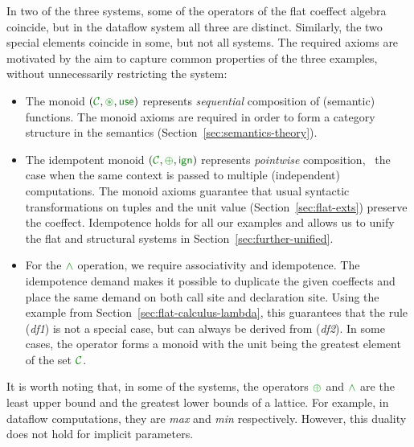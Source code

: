 \noindent
In two of the three systems, some of the operators of the flat coeffect algebra coincide, but
in the dataflow system all three are distinct. Similarly, the two special elements
coincide in some, but not all systems. The required axioms are motivated by the aim to capture
common properties of the three examples, without unnecessarily restricting the system:

\begin{itemize}
\item The monoid $(\C, \cseq, \cunit)$ represents \emph{sequential} composition of (semantic)
functions. The monoid axioms are required in order to form a category structure in the
semantics (Section~\ref{sec:semantics-theory}).

\item The idempotent monoid $(\C, \cpar, \czero)$ represents \emph{pointwise} composition,
\ie~the case when the same context is passed to multiple (independent) computations. The monoid
axioms guarantee that usual syntactic transformations on tuples and the unit value
(Section~\ref{sec:flat-exts}) preserve the coeffect. Idempotence holds for all our examples
and allows us to unify the flat and structural systems in Section~\ref{sec:further-unified}.

\item For the $\czip$ operation, we require associativity and idempotence. The idempotence
demand makes it possible to duplicate the given coeffects and place the same demand on both
call site and declaration site. Using the example from Section~\ref{sec:flat-calculus-lambda},
this guarantees that the rule (\emph{df1}) is not a special case, but can always be derived
from (\emph{df2}). In some cases, the operator forms a monoid with the unit being the greatest
element of the set $\C$.
\end{itemize}

\noindent
It is worth noting that, in some of the systems, the operators $\cpar$ and $\czip$ are the least
upper bound and the greatest lower bounds of a lattice. For example, in dataflow computations, they
are \emph{max} and \emph{min} respectively. However, this duality does not hold for implicit parameters.

